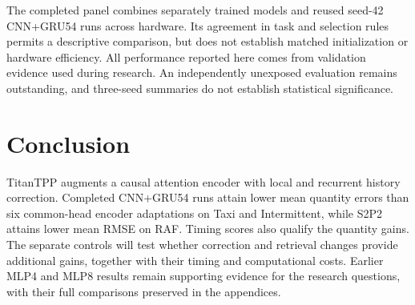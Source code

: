 \documentclass[runningheads]{llncs}
\begin{document}
The completed panel combines separately trained models and reused seed-42 CNN+GRU54 runs across hardware. Its agreement in task and selection rules permits a descriptive comparison, but does not establish matched initialization or hardware efficiency. All performance reported here comes from validation evidence used during research. An independently unexposed evaluation remains outstanding, and three-seed summaries do not establish statistical significance.

\section{Conclusion}
TitanTPP augments a causal attention encoder with local and recurrent history correction. Completed CNN+GRU54 runs attain lower mean quantity errors than six common-head encoder adaptations on Taxi and Intermittent, while S2P2 attains lower mean RMSE on RAF. Timing scores also qualify the quantity gains. The separate controls will test whether correction and retrieval changes provide additional gains, together with their timing and computational costs. Earlier MLP4 and MLP8 results remain supporting evidence for the research questions, with their full comparisons preserved in the appendices.
\end{document}
